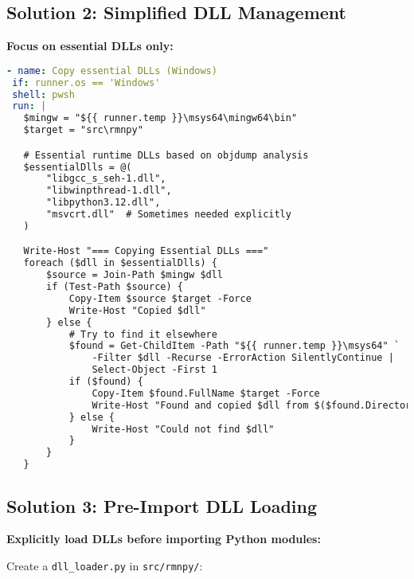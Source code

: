 \documentclass[11pt]{article}
\begin{document}
\subsection{Solution 2: Simplified DLL Management}

\textbf{Focus on essential DLLs only:}

\begin{lstlisting}[language=yaml]
- name: Copy essential DLLs (Windows)
 if: runner.os == 'Windows'
 shell: pwsh
 run: |
   $mingw = "${{ runner.temp }}\msys64\mingw64\bin"
   $target = "src\rmnpy"

   # Essential runtime DLLs based on objdump analysis
   $essentialDlls = @(
       "libgcc_s_seh-1.dll",
       "libwinpthread-1.dll",
       "libpython3.12.dll",
       "msvcrt.dll"  # Sometimes needed explicitly
   )

   Write-Host "=== Copying Essential DLLs ==="
   foreach ($dll in $essentialDlls) {
       $source = Join-Path $mingw $dll
       if (Test-Path $source) {
           Copy-Item $source $target -Force
           Write-Host "Copied $dll"
       } else {
           # Try to find it elsewhere
           $found = Get-ChildItem -Path "${{ runner.temp }}\msys64" `
               -Filter $dll -Recurse -ErrorAction SilentlyContinue |
               Select-Object -First 1
           if ($found) {
               Copy-Item $found.FullName $target -Force
               Write-Host "Found and copied $dll from $($found.DirectoryName)"
           } else {
               Write-Host "Could not find $dll"
           }
       }
   }
\end{lstlisting}

\subsection{Solution 3: Pre-Import DLL Loading}

\textbf{Explicitly load DLLs before importing Python modules:}

Create a \texttt{dll\_loader.py} in \texttt{src/rmnpy/}:
\end{document}
